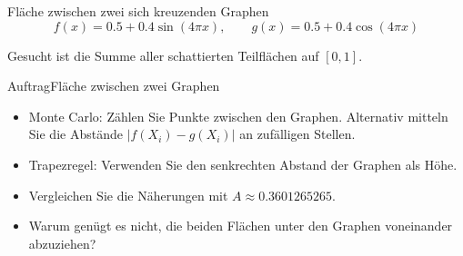 \begin{frame}{Fläche zwischen zwei sich kreuzenden Graphen}
    \[
        f(x)=0.5+0.4\sin(4\pi x),\qquad
        g(x)=0.5+0.4\cos(4\pi x)
    \]
    \begin{center}
        
    \end{center}
    Gesucht ist die Summe aller schattierten Teilflächen auf $[0,1]$.
\end{frame}

\begin{frame}{Auftrag}{Fläche zwischen zwei Graphen}
    \begin{itemize}
        \item Monte Carlo: Zählen Sie Punkte zwischen den Graphen. Alternativ mitteln Sie die Abstände $|f(X_i)-g(X_i)|$ an zufälligen Stellen.
        \item Trapezregel: Verwenden Sie den senkrechten Abstand der Graphen als Höhe.
        \item Vergleichen Sie die Näherungen mit $A\approx 0.3601265265$.
        \item Warum genügt es nicht, die beiden Flächen unter den Graphen voneinander abzuziehen?
    \end{itemize}
\end{frame}
